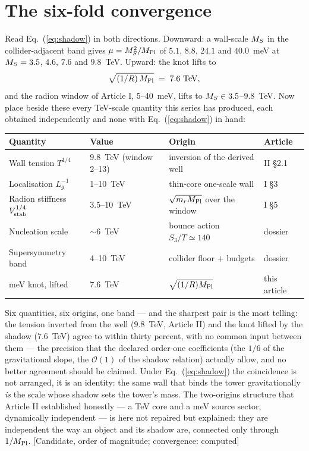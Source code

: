 \section{The six-fold convergence}
Read Eq.~(\ref{eq:shadow}) in both directions. Downward: a wall-scale $M_S$ in the collider-adjacent band gives $\mu=M_S^{2}/M_{\rm Pl}$ of $5.1$, $8.8$, $24.1$ and $40.0$~meV at $M_S=3.5$, $4.6$, $7.6$ and $9.8$~TeV. Upward: the knot lifts to
\begin{equation}
\sqrt{(1/R)\,M_{\rm Pl}}\;=\;7.6~\mathrm{TeV},
\end{equation}
and the radion window of Article I, 5--40~meV, lifts to $M_S\in3.5$--$9.8$~TeV. Now place beside these every TeV-scale quantity this series has produced, each obtained independently and none with Eq.~(\ref{eq:shadow}) in hand:
\begin{center}\small
\begin{tabular}{llll}
\toprule
\textbf{Quantity} & \textbf{Value} & \textbf{Origin} & \textbf{Article}\\
\midrule
Wall tension $T^{1/4}$ & $9.8$~TeV (window 2--13) & inversion of the derived well & II \S2.1\\
Localisation $L_{g}^{-1}$ & 1--10~TeV & thin-core one-scale wall & I \S3\\
Radion stiffness $V_{\rm stab}^{1/4}$ & 3.5--10~TeV & $\sqrt{m_{r}M_{\rm Pl}}$ over the window & I \S5\\
Nucleation scale & $\sim$6~TeV & bounce action $S_{3}/T\simeq140$ & dossier\\
Supersymmetry band & 4--10~TeV & collider floor $+$ budgets & dossier\\
meV knot, lifted & $7.6$~TeV & $\sqrt{(1/R)M_{\rm Pl}}$ & this article\\
\bottomrule
\end{tabular}
\end{center}
Six quantities, six origins, one band --- and the sharpest pair is the most telling: the tension inverted from the well ($9.8$~TeV, Article II) and the knot lifted by the shadow ($7.6$~TeV) agree to within thirty percent, with no common input between them --- the precision that the declared order-one coefficients (the $1/6$ of the gravitational slope, the $\mathcal{O}(1)$ of the shadow relation) actually allow, and no better agreement should be claimed. Under Eq.~(\ref{eq:shadow}) the coincidence is not arranged, it is an identity: the same wall that binds the tower gravitationally \emph{is} the scale whose shadow sets the tower's mass. The two-origins structure that Article II established honestly --- a TeV core and a meV source sector, dynamically independent --- is here not repaired but explained: they are independent the way an object and its shadow are, connected only through $1/M_{\rm Pl}$. [Candidate, order of magnitude; convergence: computed]

